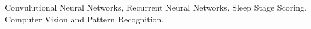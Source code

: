\begin{abstract}






\end{abstract}
\begin{keywords}
Convulutional Neural Networks, Recurrent Neural Networks, Sleep Stage Scoring, Computer Vision and Pattern Recognition.
\end{keywords}
